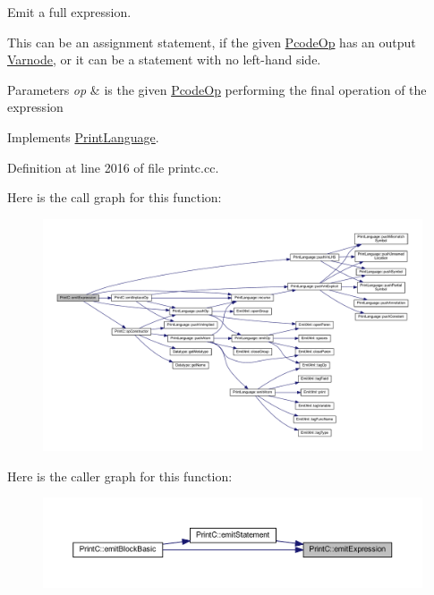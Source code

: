 Emit a full expression. 

This can be an assignment statement, if the given \mbox{\hyperlink{class_pcode_op}{Pcode\+Op}} has an output \mbox{\hyperlink{class_varnode}{Varnode}}, or it can be a statement with no left-\/hand side. 
\begin{DoxyParams}{Parameters}
{\em op} & is the given \mbox{\hyperlink{class_pcode_op}{Pcode\+Op}} performing the final operation of the expression \\
\hline
\end{DoxyParams}


Implements \mbox{\hyperlink{class_print_language_aeb6f62b1d73a32173240647b6953f80e}{Print\+Language}}.



Definition at line 2016 of file printc.\+cc.

Here is the call graph for this function\+:
\nopagebreak
\begin{figure}[H]
\begin{center}
\leavevmode
\includegraphics[width=350pt]{class_print_c_a23d8dc013a41698d5168665451b356f6_cgraph}
\end{center}
\end{figure}
Here is the caller graph for this function\+:
\nopagebreak
\begin{figure}[H]
\begin{center}
\leavevmode
\includegraphics[width=350pt]{class_print_c_a23d8dc013a41698d5168665451b356f6_icgraph}
\end{center}
\end{figure}
\mbox{\label{class_print_c_a38f45bf42a0b28ed731eb036636d0a11}} 
